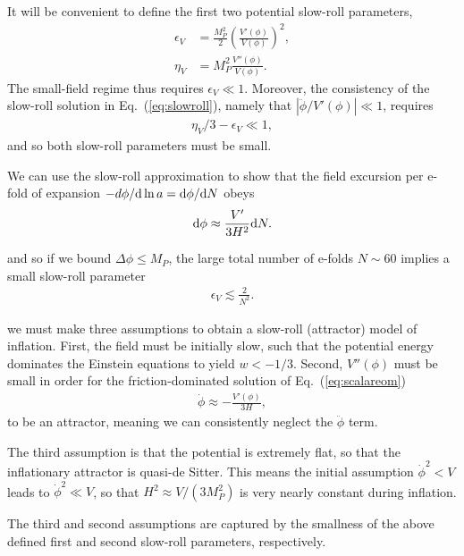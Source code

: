 \documentclass[aps,amsfonts,amsmath,prd,preprint,nofootinbib,superscriptaddress]{revtex4}
\newcommand{\Mp}{{M_{P}}}
\newcommand{\MMp}{{M_P^2}}
\newcommand{\rmd}{{\rm d}}
\begin{document}
\begin{appendix}
It will be convenient to define the first two potential slow-roll parameters,
\begin{align}
\epsilon_V &= \frac{\MMp}{2}\left(\frac{V'(\phi)}{V(\phi)}\right)^2,\\
\eta_V &=  \MMp \frac{V''(\phi)}{V(\phi)}.
\end{align}
The small-field regime thus requires $\epsilon_V \ll 1$.
Moreover, the consistency of the slow-roll solution in Eq.~(\ref{eq:slowroll}), namely that $\left|\ddot \phi/V'(\phi)\right| \ll 1$, requires
\begin{align}
\eta_V/3 - \epsilon_V \ll 1,
\end{align}
and so both slow-roll parameters must be small.







We can use the slow-roll approximation to show that the field excursion per e-fold of expansion $-d\phi/\rmd \ln a = \rmd\phi/\rmd N$ obeys
\begin{align}
\rmd \phi \approx \frac{V'}{3 H^2} \rmd N.
\end{align}

and so if we bound $\Delta \phi \leq \Mp$, the large total number of e-folds $N \sim 60$ implies a small slow-roll parameter
\begin{align}
\epsilon_V \lesssim \frac{2}{N^2}.
\end{align}


we must make three assumptions to obtain a slow-roll (attractor) model of inflation.  
First, the field must be initially slow, such that the potential energy dominates the Einstein equations to yield $w < -1/3$.
Second, $V''(\phi)$ must be small in order for the friction-dominated solution of Eq.~(\ref{eq:scalareom})
\begin{align}
\dot\phi \approx -\frac{V'(\phi)}{3 H},
\end{align}
to be an attractor, meaning we can consistently neglect the $\ddot \phi$ term.

The third assumption is that the potential is extremely flat, so that the inflationary attractor is quasi-de Sitter.  
This means the initial assumption $\dot\phi^2 < V$ leads to $\dot\phi^2 \ll V$, so that $H^2 \approx V/(3\MMp)$ is very nearly constant during inflation.


The third and second assumptions are captured by the smallness of the above defined
first and second slow-roll parameters,
respectively.


\end{appendix}
\end{document}
